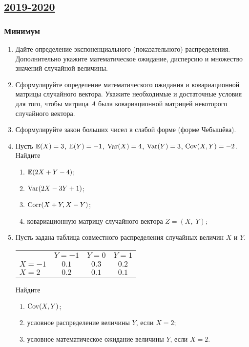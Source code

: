 \subsection[2019-2020]{\hyperref[sec:sol_kr_02_2019_2020]{2019-2020}}
\label{sec:kr_02_2019_2020}

\subsubsection*{Минимум}


\begin{enumerate}


  \item Дайте определение экспоненциального (показательного) распределения. 
  Дополнительно укажите математическое ожидание, дисперсию и множество значений случайной величины.
  
  \item Сформулируйте определение математического ожидания и ковариационной матрицы случайного
  вектора. Укажите необходимые и достаточные условия для того, 
  чтобы матрица $A$ была ковариационной матрицей некоторого случайного вектора.
  
  \item Сформулируйте закон больших чисел в слабой форме (форме Чебышёва).
  
  
  \item Пусть $\operatorname{\mathbb{E}}(X)=3$, $\operatorname{\mathbb{E}}(Y)=-1$, $\operatorname{Var}(X) = 4$, $\operatorname{Var}(Y) = 3$, $\operatorname{Cov}(X,Y) = -2$. Найдите
  \begin{enumerate}
  \item $\operatorname{\mathbb{E}}(2X + Y - 4)$;
  \item $\operatorname{Var}(2X - 3Y +1)$;
  \item $\operatorname{Corr}(X + Y, X - Y)$;
  \item ковариационную матрицу случайного вектора $Z = (X, \; Y)$;
  \end{enumerate}
  
  
  
  \item Пусть задана таблица совместного распределения случайных величин $X$ и $Y$.
  
  \begin{center}
  \begin{tabular}{lccc}
  \toprule
                         & $Y=-1$  & $Y=0$   & $Y=1$   \\ \midrule
  $X=-1$                 & $0.1$ & $0.3$ & $0.2$ \\
   $X=2$                 & $0.2$ & $0.1$ & $0.1$ \\ \bottomrule
  \end{tabular}
  \end{center}
  
  Найдите
  \begin{enumerate}
  \item $\operatorname{Cov}(X, Y)$;
  \item условное распределение величины $Y$, если $X=2$;
  \item условное математическое ожидание величины $Y$, если $X=2$.
  \end{enumerate}
  
  
  \end{enumerate}

